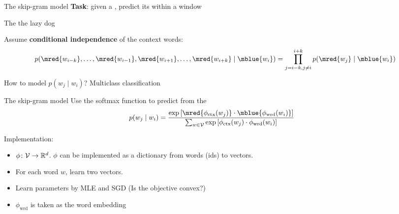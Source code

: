 \documentclass[usenames,dvipsnames,notes,11pt,aspectratio=169]{beamer}
\begin{document}
\begin{frame}
    {The skip-gram model}
    \textbf{Task}: given a , predict its  within a window
    \begin{center}
        The      the lazy dog
    \end{center}

    \pause
    Assume {\bf conditional independence} of the context words:
    $$
    p(\mred{w_{i-k}}, \ldots, \mred{w_{i-1}}, \mred{w_{i+1}}, \ldots, \mred{w_{i+k}} \mid \mblue{w_i}) =
    \prod_{j=i-k,j\neq i}^{i+k}p(\mred{w_j}\mid \mblue{w_i})
    $$

    \pause
    How to model $p(w_j\mid w_i)$? \pause \hspace{2em} Multiclass classification
\end{frame}

\begin{frame}
    {The skip-gram model}
    Use the softmax function to predict  from the 
    \begin{align*}
        p(w_j\mid w_i) %
        &= \frac{\exp\pb{\mred{\phi_{\text{ctx}}(w_j)}\cdot \mblue{\phi_{\text{wrd}}(w_i)}}}
        {\sum_{w\in\sV} \exp\pb{\phi_{\text{ctx}}(w_j)\cdot\phi_{\text{wrd}}(w_i)}}
    \end{align*}
    \pause

    \pause
    Implementation:\vspace{-1em}
    \begin{itemize}[<+->]
        \item $\phi\colon \mathcal{V} \to \mathbb{R}^d$. 
            $\phi$ can be implemented as a dictionary from words (ids) to vectors.
    \item For each word $w$, learn two vectors.
        \item Learn parameters by MLE and SGD (Is the objective convex?)
        \item $\phi_{\text{wrd}}$ is taken as the word embedding
    \end{itemize}
\end{frame}
\end{document}
